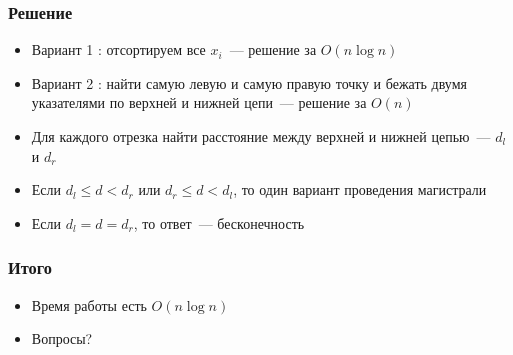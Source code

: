 \begin{frame}
  \frametitle{Решение}
  \begin{itemize}
    \item Вариант 1 : отсортируем все $x_i$~--- решение за $O(n \log n)$
    \item Вариант 2 : найти самую левую и самую правую точку и бежать двумя указателями по верхней и нижней цепи~--- решение за $O(n)$
    \item Для каждого отрезка найти расстояние между верхней и нижней цепью~--- $d_l$ и $d_r$
    \item Если $d_l \le d < d_r$ или $d_r \le d < d_l$, то один вариант проведения магистрали
    \item Если $d_l = d = d_r$, то ответ~--- бесконечность
  \end{itemize}
\end{frame}

\begin{frame}
  \frametitle{Итого}
  \begin{itemize}
    \item Время работы есть $O(n \log n)$
    \item Вопросы?
  \end{itemize}
\end{frame}
